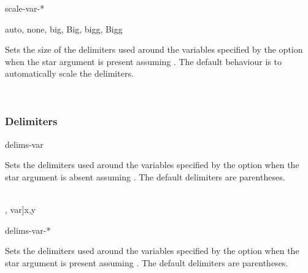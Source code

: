 \begin{option}{scale-var-*}
	\begin{values}[default = auto]
		auto, none, big, Big, bigg, Bigg
	\end{values}
	Sets the size of the delimiters used around the variables specified by the  option when the star argument is present assuming . The default behaviour is to automatically scale the delimiters.
	\begin{example}
		\\
	\end{example}
\end{option}

\subsubsection*{Delimiters}

\begin{option}{delims-var}
	\begin{values}[default = (~)]
		\meta{right delimiter}
	\end{values}
	Sets the delimiters used around the variables specified by the  option when the star argument is absent assuming . The default delimiters are parentheses.
	\begin{example}
		\odif[delims-var=\{\}, var]{x,y}\\
		\odif[delims-var=[], var]{x,y}
	\end{example}
\end{option}

\begin{option}{delims-var-*}
	\begin{values}[default = (~)]
	\end{values}
	Sets the delimiters used around the variables specified by the  option when the star argument is present assuming . The default delimiters are parentheses.
	\begin{example}
		\odif*[delims-var-*=\|\|, var]{x,y}\\
		\odif*[delims-var-*=\langle\rangle, var]{x,y}
	\end{example}
\end{option}

